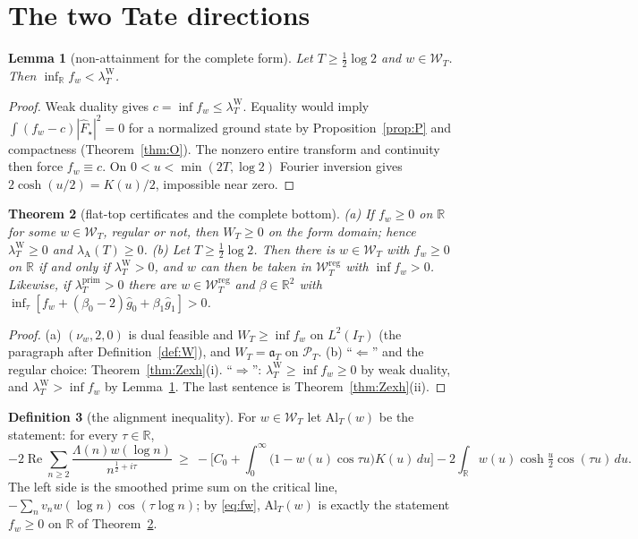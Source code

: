 \documentclass[10pt]{amsart}
\newtheorem{theorem}{Theorem}[section]
\newtheorem{lemma}[theorem]{Lemma}
\theoremstyle{definition}
\newtheorem{definition}[theorem]{Definition}
\theoremstyle{remark}
\newcommand{\R}{\mathbb R}
\newcommand{\Rel}{\operatorname{Re}}
\newcommand{\PT}{\mathcal P_T}
\newcommand{\IT}{I_T}
\newcommand{\lamP}{\lambda^{\mathrm{prim}}_T}
\newcommand{\lamW}{\lambda^{\mathrm W}_T}
\newcommand{\lamA}{\lambda_{\mathrm A}(T)}
\newcommand{\gh}[1]{\widehat g_{#1}}
\newcommand{\Fh}{\widehat F}
\newcommand{\Wcl}{\mathcal W_T}
\begin{document}
\section{The two Tate directions}\label{sec:complete}

\begin{lemma}[non-attainment for the complete form]\label{lem:Onat}
Let $T\ge\frac12\log2$ and $w\in\Wcl$. Then $\inf_\R f_w<\lamW$.
\end{lemma}
\begin{proof}
Weak duality gives $c=\inf f_w\le\lamW$. Equality would imply
$\int(f_w-c)|\Fh_\star|^2=0$ for a normalized ground state
by Proposition~\ref{prop:P} and compactness (Theorem~\ref{thm:O}).
The nonzero entire transform and continuity then force $f_w\equiv c$.
On $0<u<\min(2T,\log2)$ Fourier inversion gives
$2\cosh(u/2)=K(u)/2$, impossible near zero.
\end{proof}

\begin{theorem}[flat-top certificates and the complete bottom]\label{thm:Al}
\emph{(a)} If $f_w\ge0$ on $\R$ for some $w\in\Wcl$, regular or not, then $W_T\ge0$ on the form domain;
hence $\lamW\ge0$ and $\lamA\ge0$.
\emph{(b)} Let $T\ge\frac12\log2$. Then there is $w\in\Wcl$ with $f_w\ge0$ on $\R$ if and only if
$\lamW>0$, and $w$ can then be taken in $\Wcl^{\mathrm{reg}}$ with $\inf f_w>0$. Likewise, if $\lamP>0$
there are $w\in\Wcl^{\mathrm{reg}}$ and $\beta\in\R^2$ with $\inf_\tau[f_w+(\beta_0-2)\gh0+\beta_1\gh1]>0$.
\end{theorem}
\begin{proof}
(a) $(\nu_w,2,0)$ is dual feasible and $W_T\ge\inf f_w$ on $L^2(\IT)$ (the paragraph after
Definition~\ref{def:W}), and $W_T=\mathfrak a_T$ on $\PT$. (b) ``$\Leftarrow$'' and the regular choice:
Theorem~\ref{thm:Zexh}(i). ``$\Rightarrow$'': $\lamW\ge\inf f_w\ge0$ by weak duality, and $\lamW>\inf f_w$ by
Lemma~\ref{lem:Onat}. The last sentence is Theorem~\ref{thm:Zexh}(ii).
\end{proof}

\begin{definition}[the alignment inequality]\label{def:Al}
For $w\in\Wcl$ let $\mathrm{Al}_T(w)$ be the statement: for every $\tau\in\R$,
\[
-2\Rel\sum_{n\ge2}\frac{\Lambda(n)w(\log n)}{n^{\frac12+i\tau}}\ \ge\
-\Big[C_0+\int_0^\infty\big(1-w(u)\cos\tau u\big)K(u)\,du\Big]-2\int_\R w(u)\cosh\tfrac u2\cos(\tau u)\,du .
\]
The left side is the smoothed prime sum on the critical line, $-\sum_nv_nw(\log n)\cos(\tau\log n)$; by
\eqref{eq:fw}, $\mathrm{Al}_T(w)$ is exactly the statement $f_w\ge0$ on $\R$ of Theorem~\ref{thm:Al}.
\end{definition}
\end{document}
